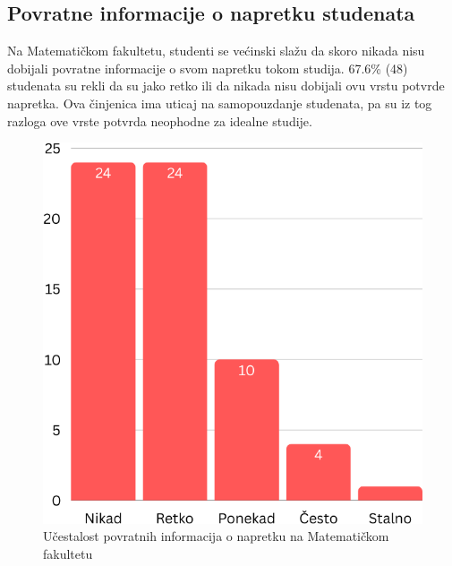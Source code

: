 \documentclass[a4paper]{article}
\begin{document}
{\subsection{Povratne informacije o napretku studenata}
\label{subsec:napredak_iskustva}
Na Matematičkom fakultetu, studenti se većinski slažu da skoro nikada nisu dobijali povratne informacije o svom napretku tokom studija. 67.6\% (48) studenata su rekli da su jako retko ili da nikada nisu dobijali ovu vrstu potvrde napretka. Ova činjenica ima uticaj na samopouzdanje studenata, pa su iz tog razloga ove vrste potvrda neophodne za idealne studije. 
\begin{figure}[h!]
\begin{center}
    \includegraphics[scale = 0.3]{PovratneInformacijeMatf.png}
    \caption{Učestalost povratnih informacija o napretku na Matematičkom fakultetu}
    \label{fig:povratne_informacije_matf}
\end{center}
\end{figure}

}
\end{document}
